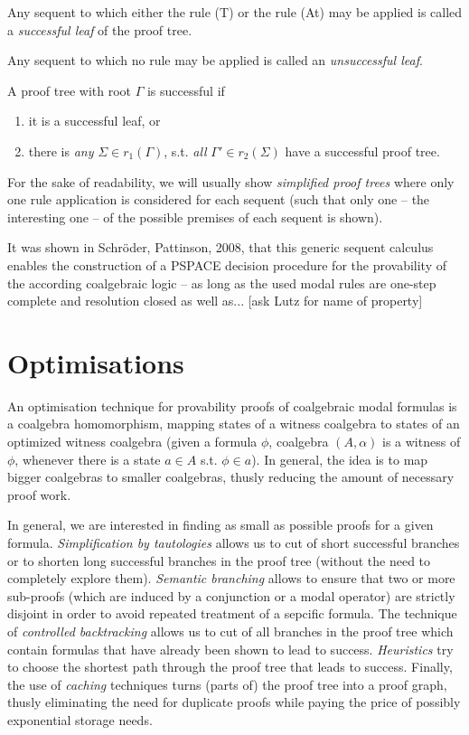 \documentclass{llncs}
\begin{document}
Any sequent to which either the rule (T) or the rule (At) may be applied
is called a \emph{successful leaf} of the proof tree.

Any sequent to which no rule may be applied is called an \emph{unsuccessful leaf}.

A proof tree with root $\Gamma$ is successful if
\begin{enumerate}
\item it is a successful leaf, or
\item there is \emph{any} $\Sigma\in r_1(\Gamma)$, s.t. \emph{all} $\Gamma'\in r_2(\Sigma)$ have a successful proof tree.
\end{enumerate}

For the sake of readability, we will usually show \emph{simplified proof trees} where only one rule application
is considered for each sequent (such that only one -- the interesting one -- of the possible premises of each sequent is shown).

It was shown in Schr\"oder, Pattinson, 2008, that this generic sequent calculus enables the construction of a PSPACE
decision procedure for the provability of the according coalgebraic logic -- as long as the used modal rules are one-step
complete and resolution closed as well as... [ask Lutz for name of property]

\section{Optimisations}

An optimisation technique for provability proofs of coalgebraic modal formulas is
a coalgebra homomorphism, mapping states of a witness coalgebra to states of an optimized
witness coalgebra (given a formula $\phi$, coalgebra $(A,\alpha)$ is a witness of $\phi$, whenever
there is a state $a\in A$ s.t. $\phi\in a$). In general, the idea is to map bigger coalgebras
to smaller coalgebras, thusly reducing the amount of necessary proof work.

In general, we are interested in finding as small as possible proofs for a given formula.
\emph{Simplification by tautologies} allows us to cut of short successful branches or to shorten
long successful branches in the proof tree (without the need to completely explore them).
\emph{Semantic branching} allows to ensure that two or more sub-proofs (which are induced by a
conjunction or a modal operator) are strictly disjoint in order to avoid repeated treatment of a
sepcific formula. The technique of \emph{controlled backtracking} allows us to cut of all
branches in the proof tree which contain formulas that have already been shown to lead to success.
\emph{Heuristics} try to choose the shortest path through the proof tree that leads to success.
Finally, the use of \emph{caching} techniques turns (parts of) the proof tree into a proof graph,
thusly eliminating the need for duplicate proofs while paying the price of possibly exponential
storage needs.
\end{document}
